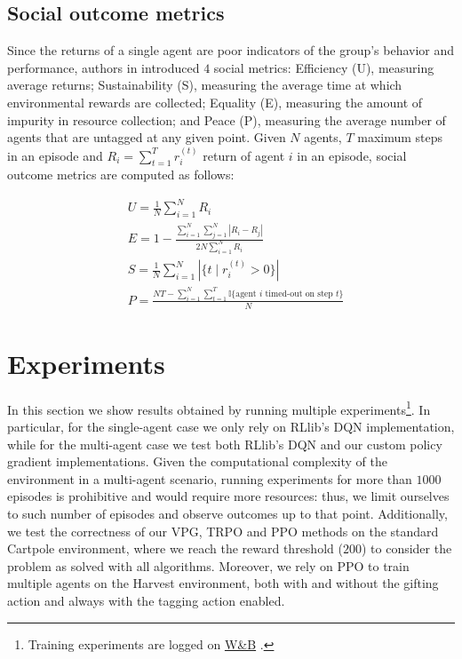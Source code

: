 \documentclass{article}
\begin{document}
\subsection{Social outcome metrics}
Since the returns of a single agent are poor indicators of the group's behavior and performance, authors in \cite{harvest} introduced $4$ social metrics: Efficiency (U), measuring average returns; Sustainability (S), measuring the average time at which environmental rewards are collected; Equality (E), measuring the amount of impurity in resource collection; and Peace (P), measuring the average number of agents that are untagged at any given point. Given $N$ agents, $T$ maximum steps in an episode and $R_i=\sum_{t=1}^T r_i^{(t)}$ return of agent $i$ in an episode, social outcome metrics are computed as follows:

\begin{equation}
  \label{eq:metrics}
  \begin{aligned}
    & U = \frac{1}{N}\sum_{i=1}^N R_i\\
    & E = 1 - \frac{\sum_{i=1}^N\sum_{j=1}^N |R_i-R_j|}{2N\sum_{i=1}^N R_i} \\
    & S = \frac{1}{N}\sum_{i=1}^N |\{t\mid r_i^{(t)}>0\}| \\
    & P = \frac{NT-\sum_{i=1}^N\sum_{t=1}^T \mathbb{I}\{\text{agent } i \text{ timed-out on step } t\}}{N}
  \end{aligned}
\end{equation}

\section{Experiments}
In this section we show results obtained by running multiple experiments\footnote{Training experiments are logged on \href{https://wandb.ai/wadaboa/cpr-appropriation}{W\&B} \cite{wandb}.}. In particular, for the single-agent case we only rely on RLlib's DQN implementation, while for the multi-agent case we test both RLlib's DQN and our custom policy gradient implementations. Given the computational complexity of the environment in a multi-agent scenario, running experiments for more than $1000$ episodes is prohibitive and would require more resources: thus, we limit ourselves to such number of episodes and observe outcomes up to that point. Additionally, we test the correctness of our VPG, TRPO and PPO methods on the standard Cartpole environment, where we reach the reward threshold ($200$) to consider the problem as solved with all algorithms. Moreover, we rely on PPO to train multiple agents on the Harvest environment, both with and without the gifting action and always with the tagging action enabled.
\end{document}
